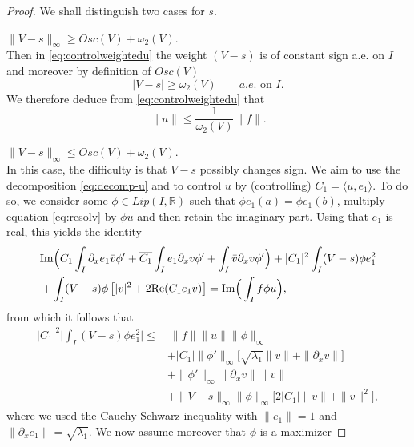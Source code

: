 \documentclass[12pt]{article}
\newcommand{\R}{\mathbb{R}}
\begin{document}
\begin{proof}
We shall distinguish two cases for $s$.

\smallskip

 $\|V - s\|_\infty \geq Osc(V) + \omega_2(V).$\\
Then in \eqref{eq:controlweightedu} the 
weight $(V - s)$ is of constant sign a.e. on $I$ and moreover 
by definition of $Osc(V)$ 
$$
|V - s| \geq \omega_2(V) \qquad a.e. \text{ on } I.
$$
We therefore deduce from \eqref{eq:controlweightedu} that
\begin{equation}\label{eq:case1}
\|u \| \leq \frac{1}{\omega_2(V)} \|f\|.
\end{equation}

\medskip
{} $\|V - s\|_\infty \leq Osc(V) + \omega_2(V).$\\
In this case, the difficulty is that $V - s$ possibly changes sign. We aim to use the 
decomposition \eqref{eq:decomp-u} and to control $u$ by (controlling) 
$C_1=\langle u, e_1 \rangle$. To do so, we consider some $\phi \in Lip(I, \R)$ 
such that $\phi e_1(a) = \phi e_1(b)$,
multiply equation \eqref{eq:resolv} by $\phi \bar u$ and then retain the
imaginary part. Using that $e_1$ is real, this yields the identity 
\begin{equation}\label{eq:weightedident}\begin{split}
&{\rm Im}\Big(
C_1 \int_I \partial_x e_1 \bar v \phi' + \overline{C_1} \int_I e_1 \partial_x v \phi'
+ \int_I \bar v \partial_x v \phi' \Big) + |C_1|^2 \int_I (V - s)\phi e_1^2\\
& + \int_I (V - s) \phi \left[ |v|^2 + 2 {\rm Re}(C_1 e_1\bar v)\right]
= {\rm Im}\Big( \int_I f\phi \bar u\Big),
\end{split}\end{equation}
from which it follows that
\begin{equation}\label{eq:controlC1}\begin{split}
|C_1|^2 \Big| \int_I (V-s)\phi e_1^2 \Big| \leq 
& \ \|f\| \|u\| \|\phi\|_\infty\\
	& + |C_1| \|\phi'\|_\infty \Big[ \sqrt{\lambda_1}\|v\| + \|\partial_x v\| \Big] \\
& + \|\phi'\|_\infty \|\partial_x v\| \|v\|\\
&+ \|V - s\|_\infty \|\phi\|_\infty \Big[ 2 |C_1| \|v\| + \|v\|^2\Big],
\end{split}\end{equation}
where we used the Cauchy-Schwarz inequality with $\|e_1\|=1$ and 
$\|\partial_x e_1\|=\sqrt{\lambda_1}$. We now assume moreover that $\phi$ is a maximizer 

\end{proof}
\end{document}
